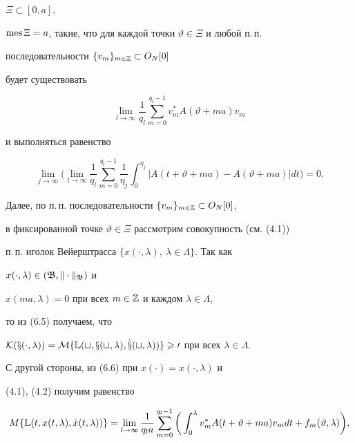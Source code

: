 $\Xi\subset[0,a]$,

$\operatorname{mes}\Xi=a$, такие, что для каждой точки $\vartheta\in\Xi$ и любой п.\,п.

последовательности $\{v_m\}_{m\in\Bbb Z}\subset O_N[0]$

будет существовать

\begin{equation}

\lim_{l\to\infty}\frac{1}{q_l}\sum_{m=0}^{q_l-1}

v_m^{*}A(\vartheta+ma)v_m

\end{equation}

и выполняться равенство

\begin{equation}

\lim_{j\to\infty}\bigg(\lim_{l\to\infty}\frac{1}{q_l}

\sum_{m=0}^{q_l-1}\frac{1}{\eta_j}\int_{0}^{\eta_j}|A(t+\vartheta+ma)-

A(\vartheta+ma)|dt\bigg)=0.

\end{equation}



Далее, по п.\,п. последовательности $\{v_m\}_{m\in\Bbb Z}\subset O_N[0]$,

в фиксированной точке $\vartheta\in\Xi$ рассмотрим совокупность (см. (4.1))

п.\,п. иголок Вейерштрасса $\{x(\cdot,\lambda),\ \lambda{\in}\Lambda\}$. Так как

$x(\cdot,\lambda)\in(\frak B,\|\cdot\|_{\frak B})$ и

$x(ma,\lambda)=0$ при всех $m\in{\Bbb Z}$ и каждом $\lambda\in\Lambda$,

то из (6.5) получаем, что

$\cal K(x(\cdot,\lambda))=M\{\Bbb L(t,x(t,\lambda),\Dot

x(t,\lambda))\}\geqslant 0$ при всех $\lambda\in\Lambda$.

С другой стороны, из (6.6) при $x(\cdot)=x(\cdot,\lambda)$ и

(4.1), (4.2) получим равенство

\begin{equation}

M\{\Bbb L(t,x(t,\lambda),\Dot x(t,\lambda))\}=

\lim_{l\to\infty}\frac{1}{q_la}\sum_{m=0}^{q_l-1}

\bigg(\int_0^\lambda v_m^*A(t+\vartheta+ma)

v_m dt+f_m(\vartheta,\lambda)\bigg),

\end{equation}

